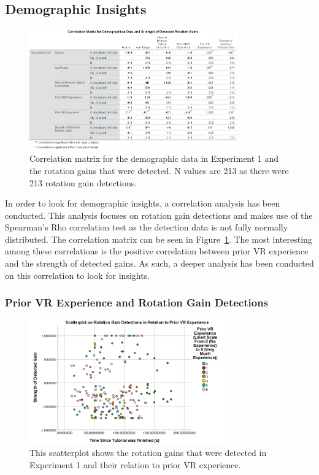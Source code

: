 \subsection{Demographic Insights}
\begin{figure}[tbph]
    \centering
    \includegraphics[width=0.8\textwidth]{figures/graphs/DemographicalCorrelationsEx1.png}
    \caption[Experiment 1 Demographic Correlation Matrix]{Correlation matrix for the demographic data in Experiment 1 and the rotation gains that were detected. N values are 213 as there were 213 rotation gain detections.}
    \label{fig:ex1demogcorrelationmatrix}
\end{figure}

In order to look for demographic insights, a correlation analysis has been conducted. This analysis focuses on rotation gain detections and makes use of the Spearman's Rho correlation test as the detection data is not fully normally distributed. The correlation matrix can be seen in Figure~\ref{fig:ex1demogcorrelationmatrix}. The most interesting among these correlations is the positive correlation between prior VR experience and the strength of detected gains. As such, a deeper analysis has been conducted on this correlation to look for insights. 

\subsubsection{Prior VR Experience and Rotation Gain Detections}
\begin{figure}[tbph]
    \centering
    \includegraphics[width=0.75\textwidth]{figures/graphs/PriorVRExperienceDetectionScatter.png}
    \caption[Scatterplot on Rotation Gain Detections in Relation to Prior VR Experience]{This scatterplot shows the rotation gains that were detected in Experiment 1 and their relation to prior VR experience.}
    \label{fig:rotationGainDetectionScatterVRExperience}
\end{figure}


